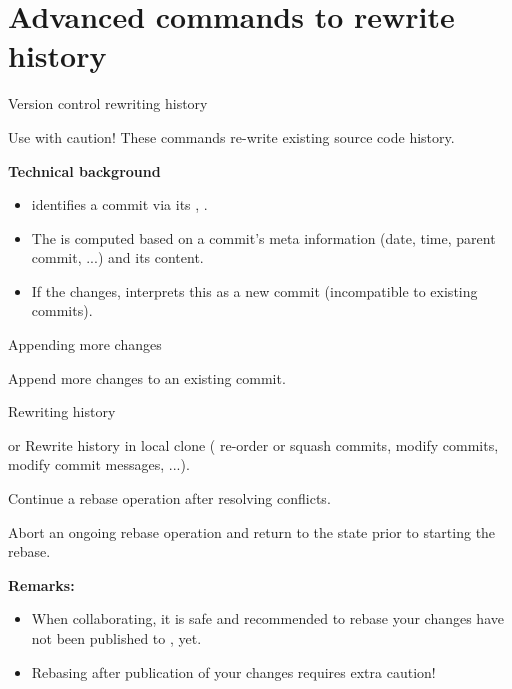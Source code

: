 \section{Advanced  commands to rewrite history}

\begin{frame}{Version control {\vs} rewriting history}
\begin{alertblock}{Use with caution!}
These commands re-write existing source code history.
\end{alertblock}

\textbf{Technical background}
\begin{itemize}
\item {} identifies a commit via its , {\eg} .
\item The  is computed based on a commit's meta information (date, time, parent commit, ...) and its content.
\item If the  changes,  interprets this as a new commit (incompatible to existing commits). 
\end{itemize}
\end{frame}

\begin{frame}{Appending more changes}
\begin{block}{}
Append more changes to an existing commit.
\end{block}
\end{frame}

\begin{frame}{Rewriting history}
\begin{block}{ or }
Rewrite history in local clone ({\eg} re-order or squash commits, modify commits, modify commit messages, ...).
\end{block}
\begin{block}{}
Continue a rebase operation after resolving conflicts.
\end{block}
\begin{block}{}
Abort an ongoing rebase operation and return to the state prior to starting the rebase.
\end{block}
\textbf{Remarks:}
\begin{itemize}
\item When collaborating, it is safe and recommended to rebase  your changes have not been published to , yet.
\item Rebasing after publication of your changes requires extra caution!
\end{itemize}

\end{frame}

